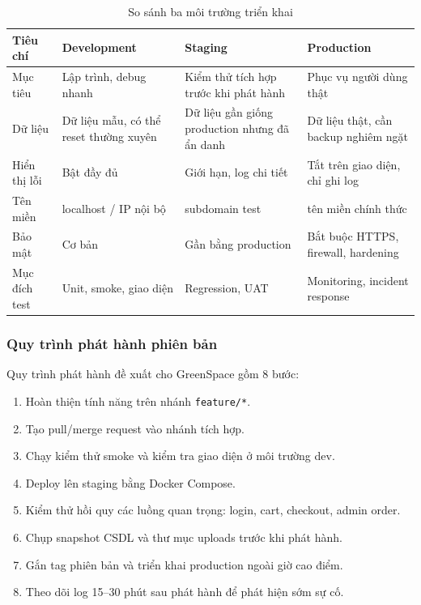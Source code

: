\documentclass[11pt, a4paper]{article}
\begin{document}
\begin{table}[H]
    \centering
    \caption{So sánh ba môi trường triển khai}
    \label{tab:env-compare}
    \begin{tabularx}{\linewidth}{|>{\raggedright\arraybackslash}p{3.2cm}
                                  |>{\raggedright\arraybackslash}p{3.3cm}
                                  |>{\raggedright\arraybackslash}p{3.3cm}
                                  |Y|}
        \hline
        \textbf{Tiêu chí} & \textbf{Development} & \textbf{Staging} & \textbf{Production} \\ \hline
        Mục tiêu & Lập trình, debug nhanh & Kiểm thử tích hợp trước khi phát hành & Phục vụ người dùng thật \\ \hline
        Dữ liệu & Dữ liệu mẫu, có thể reset thường xuyên & Dữ liệu gần giống production nhưng đã ẩn danh & Dữ liệu thật, cần backup nghiêm ngặt \\ \hline
        Hiển thị lỗi & Bật đầy đủ & Giới hạn, log chi tiết & Tắt trên giao diện, chỉ ghi log \\ \hline
        Tên miền & localhost / IP nội bộ & subdomain test & tên miền chính thức \\ \hline
        Bảo mật & Cơ bản & Gần bằng production & Bắt buộc HTTPS, firewall, hardening \\ \hline
        Mục đích test & Unit, smoke, giao diện & Regression, UAT & Monitoring, incident response \\ \hline
    \end{tabularx}
\end{table}

\subsubsection{Quy trình phát hành phiên bản}

Quy trình phát hành đề xuất cho GreenSpace gồm 8 bước:

\begin{enumerate}[leftmargin=*]
    \item Hoàn thiện tính năng trên nhánh \texttt{feature/*}.
    \item Tạo pull/merge request vào nhánh tích hợp.
    \item Chạy kiểm thử smoke và kiểm tra giao diện ở môi trường dev.
    \item Deploy lên staging bằng Docker Compose.
    \item Kiểm thử hồi quy các luồng quan trọng: login, cart, checkout, admin order.
    \item Chụp snapshot CSDL và thư mục uploads trước khi phát hành.
    \item Gắn tag phiên bản và triển khai production ngoài giờ cao điểm.
    \item Theo dõi log 15--30 phút sau phát hành để phát hiện sớm sự cố.
\end{enumerate}
\end{document}
